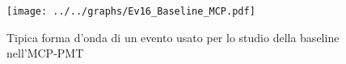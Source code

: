 \begin{figure}[h] \centering \texttt{[image: ../../graphs/Ev16\_Baseline\_MCP.pdf]}\caption{Tipica forma d'onda di un evento usato per lo studio della baseline nell'MCP-PMT}\label{gr:Ev16_Baseline_MCP} \end{figure}
